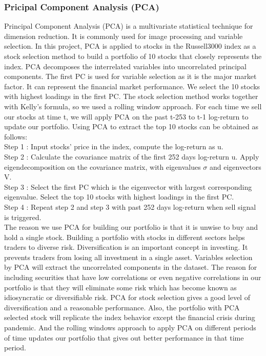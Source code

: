 \documentclass[11pt,a4paper]{article}
\begin{document}
    \subsubsection{Pricipal Component Analysis (PCA)}
    Principal Component Analysis (PCA) is a multivariate statistical technique for dimension reduction. It is commonly used for image processing and variable selection. 
    In this project, PCA is applied to stocks in the Russell3000 index as a stock selection method to build a portfolio of 10 stocks that closely represents the index. PCA decomposes the interrelated variables into uncorrelated principal components. The first PC is used for variable selection as it is the major market factor. It can represent the financial market performance. We select the 10 stocks with highest loadings in the first PC. The stock selection method works together with Kelly's formula, so we used a rolling window approach. For each time we sell our stocks at time t, we will apply PCA on the past t-253 to t-1 log-return to update our portfolio.
    Using PCA to extract the top 10 stocks can be obtained as follows: \\
    Step 1 : Input stocks' price in the index, compute the log-return as u. \\
    Step 2 : Calculate the covariance matrix of the first 252 days log-return u. Apply eigendecomposition on the covariance matrix, with eigenvalues \(\sigma\) and eigenvectors V. \\
    Step 3 : Select the first PC which is the eigenvector with largest corresponding eigenvalue. Select the top 10 stocks with highest loadings in the first PC. \\
    Step 4 : Repeat step 2 and step 3 with past 252 days log-return when sell signal is triggered. \\
    
    \noindent
    The reason we use PCA for building our portfolio is that it is unwise to buy and hold a single stock. Building a portfolio with stocks in different sectors helps traders to diverse risk. Diversification is an important concept in investing. It prevents traders from losing all investment in a single asset. Variables selection by PCA will extract the uncorrelated components in the dataset.  The reason for including securities that have low correlations or even negative correlations in our portfolio is that they will eliminate some risk which has become known as idiosyncratic or diversifiable risk. PCA for stock selection gives a good level of diversification and a reasonable performance. Also, the portfolio with PCA selected stock will replicate the index behavior except the financial crisis during pandemic. And the rolling windows approach to apply PCA on different periods of time updates our portfolio that gives out better performance in that time period. \\
    
\end{document}
